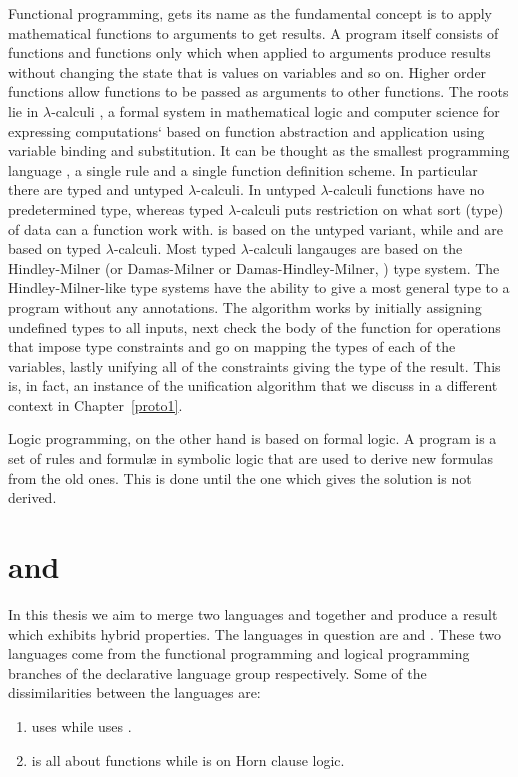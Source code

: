 \documentclass[thesis-solanki.tex]{subfiles}
\begin{document}
Functional programming, \cite{hughes1989functional} gets its name as the fundamental concept is
to apply mathematical functions to arguments to get results.
A program itself consists of functions and functions only which when applied to arguments produce results without
changing the state that is values on variables and so on.
Higher order functions allow functions to be passed as arguments to other functions.
The roots lie in $\lambda$-calculi \cite{website:lambdacalculuswiki}, a formal system in mathematical logic and
computer science for expressing computations` based on function abstraction and application using variable binding
and substitution.
It can be thought as the smallest programming language \cite{rojas2004tutorial}, a single rule and a single
function definition scheme.
In particular there are typed and untyped $\lambda$-calculi.
In untyped $\lambda$-calculi functions have no predetermined type, whereas typed $\lambda$-calculi puts restriction
on what sort (type) of data can a function work with.
 is based on the untyped variant, while  and  are based on typed
$\lambda$-calculi.
Most typed $\lambda$-calculi langauges are based on the Hindley-Milner (or Damas-Milner or Damas-Hindley-Milner,
\cite{hindley1969principal,milner1978theory,website:hdmtypesystemwiki}) type system.
The Hindley-Milner-like type systems have the ability to give a most general type to a program
without any annotations.
The algorithm \cite{website:hdmtypesystem} works by initially assigning undefined types to all inputs, next check
the body of the function for operations that impose type constraints and go on mapping the types of each of the 
variables, lastly unifying all of the constraints giving the type of the result.
This is, in fact, an instance of the unification algorithm that we discuss in a different context in Chapter~\ref{proto1}.

Logic programming, \cite{spivey1995introduction} on the other hand is based on formal logic.
A program is a set of rules and formul\ae{} in symbolic logic that are used to derive new formulas from the old
ones.
This is done until the one which gives the solution is not derived.

\section{ and }
In this thesis we aim to merge two languages  and  together and produce a result
which exhibits hybrid properties.
The languages in question are  and .
These two languages come from the functional programming and logical programming branches of the
declarative language group respectively.
Some of the dissimilarities between the languages are:
\begin{enumerate}
\item {}
  uses  while  uses
  . 
\item {} is all about functions while  is on Horn clause logic.
\end{enumerate} 
\end{document}
